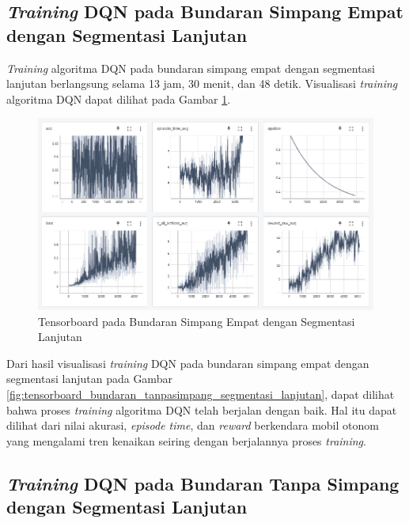 \subsection{\textit{Training} DQN pada Bundaran Simpang Empat dengan Segmentasi Lanjutan}
\label{sec:training_dqn_bundaran_simpangempat_segmentasi_hitam_putih}

\textit{Training} algoritma DQN pada bundaran simpang empat dengan segmentasi lanjutan berlangsung selama 13 jam, 30 menit, dan 48 detik. Visualisasi \textit{training} algoritma DQN dapat dilihat pada Gambar \ref{fig:tensorboard_bundaran_simpangempat_segmentasi_lanjutan}.

\begin{figure}[H] 
	\centering
	\includegraphics[width=1\linewidth]{images/tensorboard_bunderan_segmented}
	\caption{Tensorboard pada Bundaran Simpang Empat dengan Segmentasi Lanjutan}
	\label{fig:tensorboard_bundaran_simpangempat_segmentasi_lanjutan}
\end{figure}

Dari hasil visualisasi \textit{training} DQN pada bundaran simpang empat dengan segmentasi lanjutan pada Gambar \ref{fig:tensorboard_bundaran_tanpasimpang_segmentasi_lanjutan}, dapat dilihat bahwa proses \textit{training} algoritma DQN telah berjalan dengan baik. Hal itu dapat dilihat dari nilai akurasi, \textit{episode time}, dan \textit{reward} berkendara mobil otonom yang mengalami tren kenaikan seiring dengan berjalannya proses \textit{training}.


\subsection{\textit{Training} DQN pada Bundaran Tanpa Simpang dengan Segmentasi Lanjutan}
\label{sec:training_dqn_bundaran_nosimpang_segmentasi_hitam_putih}

